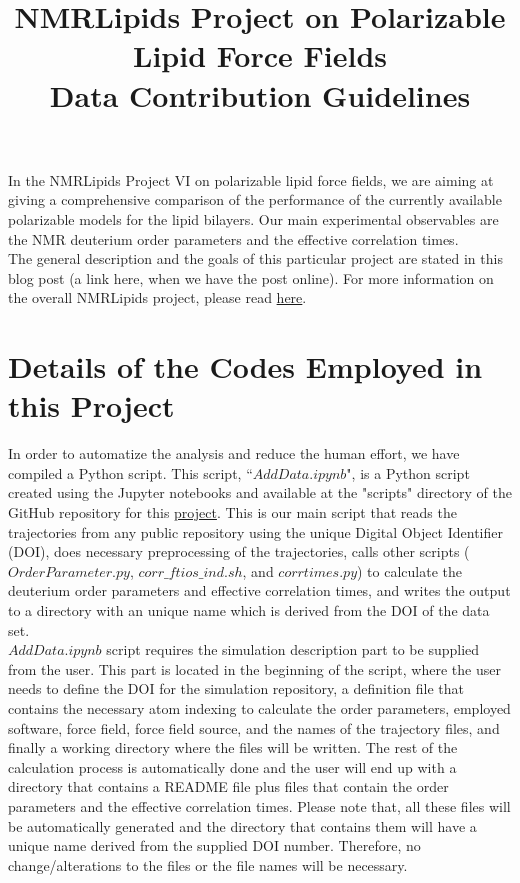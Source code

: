 \documentclass[12pt]{article}
\title{NMRLipids Project on Polarizable Lipid Force Fields\\ Data Contribution Guidelines}
\begin{document}
	
\maketitle

In the NMRLipids Project VI on polarizable lipid force fields, we are aiming at giving a comprehensive comparison of the performance of the currently available polarizable models for the lipid bilayers. Our main experimental observables are the NMR deuterium order parameters and the effective correlation times.\\

The general description and the goals of this particular project are stated in this blog post (a link here, when we have the post online). For more information on the overall NMRLipids project, please read \href{http://nmrlipids.blogspot.com}{here}.

\section{Details of the Codes Employed in this Project}

In order to automatize the analysis and reduce the human effort, we have compiled a Python script. This script, ``$AddData.ipynb$", is a Python script created using the Jupyter notebooks and available at the "scripts" directory of the GitHub repository for this \href{https://github.com/NMRLipids/NMRlipidsVIpolarizableFFs}{project}. This is our main script that reads the trajectories from any public repository using the unique Digital Object Identifier (DOI), does necessary preprocessing of the trajectories, calls other scripts ($OrderParameter.py$, $corr\_ftios\_ind.sh$, and $corrtimes.py$) to calculate the deuterium order parameters and effective correlation times, and writes the output to a directory with an unique name which is derived from the DOI of the data set. \\

$AddData.ipynb$ script requires the simulation description part to be supplied from the user. This part is located in the beginning of the script, where the user needs to define the DOI for the simulation repository, a definition file that contains the necessary atom indexing to calculate the order parameters, employed software, force field, force field source, and the names of the trajectory files, and finally a working directory where the files will be written. The rest of the calculation process is automatically done and the user will end up with a directory that contains a README file plus files that contain the order parameters and the effective correlation times. Please note that, all these files will be automatically generated and the directory that contains them will have a unique name derived from the supplied DOI number. Therefore, no change/alterations to the files or the file names will be necessary.\\
\end{document}
